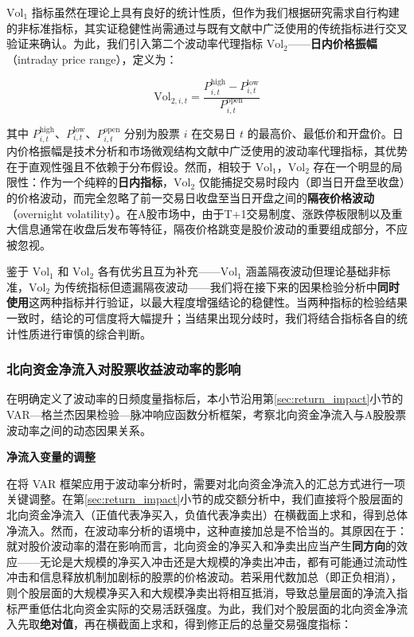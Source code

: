 \documentclass{article}
\begin{document}
$\text{Vol}_1$ 指标虽然在理论上具有良好的统计性质，但作为我们根据研究需求自行构建的非标准指标，其实证稳健性尚需通过与既有文献中广泛使用的传统指标进行交叉验证来确认。为此，我们引入第二个波动率代理指标 $\text{Vol}_2$——\textbf{日内价格振幅}（intraday price range），定义为：

\begin{equation}
    \text{Vol}_{2,i,t} = \frac{P_{i,t}^{\text{high}} - P_{i,t}^{\text{low}}}{P_{i,t}^{\text{open}}}
    \label{eq:vol2}
\end{equation}

\noindent 其中 $P_{i,t}^{\text{high}}$、$P_{i,t}^{\text{low}}$、$P_{i,t}^{\text{open}}$ 分别为股票 $i$ 在交易日 $t$ 的最高价、最低价和开盘价。日内价格振幅是技术分析和市场微观结构文献中广泛使用的波动率代理指标，其优势在于直观性强且不依赖于分布假设。然而，相较于 $\text{Vol}_1$，$\text{Vol}_2$ 存在一个明显的局限性：作为一个纯粹的\textbf{日内指标}，$\text{Vol}_2$ 仅能捕捉交易时段内（即当日开盘至收盘）的价格波动，而完全忽略了前一交易日收盘至当日开盘之间的\textbf{隔夜价格波动}（overnight volatility）。在A股市场中，由于T+1交易制度、涨跌停板限制以及重大信息通常在收盘后发布等特征，隔夜价格跳变是股价波动的重要组成部分，不应被忽视。

鉴于 $\text{Vol}_1$ 和 $\text{Vol}_2$ 各有优劣且互为补充——$\text{Vol}_1$ 涵盖隔夜波动但理论基础非标准，$\text{Vol}_2$ 为传统指标但遗漏隔夜波动——我们将在接下来的因果检验分析中\textbf{同时使用}这两种指标并行验证，以最大程度增强结论的稳健性。当两种指标的检验结果一致时，结论的可信度将大幅提升；当结果出现分歧时，我们将结合指标各自的统计性质进行审慎的综合判断。

\subsubsection{北向资金净流入对股票收益波动率的影响}
\label{sec:vol_impact}

在明确定义了波动率的日频度量指标后，本小节沿用第\ref{sec:return_impact}小节的 VAR—格兰杰因果检验—脉冲响应函数分析框架，考察北向资金净流入与A股股票波动率之间的动态因果关系。

\vspace{0.5em}
\noindent\textbf{净流入变量的调整}

在将 VAR 框架应用于波动率分析时，需要对北向资金净流入的汇总方式进行一项关键调整。在第\ref{sec:return_impact}小节的成交额分析中，我们直接将个股层面的北向资金净流入（正值代表净买入，负值代表净卖出）在横截面上求和，得到总体净流入。然而，在波动率分析的语境中，这种直接加总是不恰当的。其原因在于：就对股价波动率的潜在影响而言，北向资金的净买入和净卖出应当产生\textbf{同方向}的效应——无论是大规模的净买入冲击还是大规模的净卖出冲击，都有可能通过流动性冲击和信息释放机制加剧标的股票的价格波动。若采用代数加总（即正负相消），则个股层面的大规模净买入和大规模净卖出将相互抵消，导致总量层面的净流入指标严重低估北向资金实际的交易活跃强度。为此，我们对个股层面的北向资金净流入先取\textbf{绝对值}，再在横截面上求和，得到修正后的总量交易强度指标：
\end{document}

